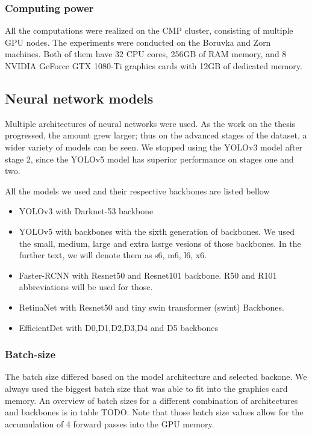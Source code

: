 \subsubsection{Computing power}
All the computations were realized on the CMP cluster, consisting of multiple GPU nodes. The experiments were conducted on the Boruvka and Zorn machines. Both of them have 32 CPU cores, 256GB of RAM memory, and 8 NVIDIA GeForce GTX 1080-Ti graphics cards with 12GB of dedicated memory.

\subsection{Neural network models}
\label{sec:methods:nns}
Multiple architectures of neural networks were used. As the work on the thesis progressed, the amount grew larger; thus on the advanced stages of the dataset, a wider variety of models can be seen. We stopped using the YOLOv3 model after stage 2, since the YOLOv5 model has superior performance on stages one and two.

All the models we used and their respective backbones are listed bellow
\begin{itemize}
    \item YOLOv3 with Darknet-53 backbone
    \item YOLOv5 with backbones with the sixth generation of backbones. We used the small, medium, large and extra lasrge vesions of those backbones. In the further text, we will denote them as s6, m6, l6, x6.
    \item Faster-RCNN with Resnet50 and Resnet101 backbone. R50 and R101 abbreviations will be used for those.
    \item RetinaNet with Resnet50 and tiny swin transformer (swint) Backbones.
    \item EfficientDet with D0,D1,D2,D3,D4 and D5 backbones
\end{itemize}

\subsubsection{Batch-size}
The batch size differed based on the model architecture and selected backone. We always used the biggest batch size that was able to fit into the graphics card memory. An overview of batch sizes for a different combination of architectures and backbones is in table TODO. Note that those batch size values allow for the accumulation of 4 forward passes into the GPU memory.

